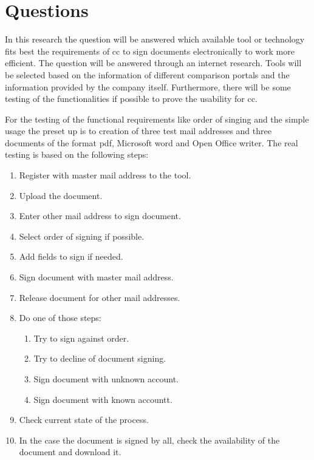 \section{Questions}

In this research the question will be answered which available tool or technology fits best the requirements of \gls{cc} to sign documents electronically to work more efficient. The  question will be answered through an internet research. Tools will be selected based on the information of different comparison portals and the information provided by the company itself. Furthermore, there will be some testing of the functionalities if possible to prove the usability for \gls{cc}. 

For the testing of the functional requirements like order of singing and the simple usage the preset up is to creation of three test mail addresses and three documents of the format \gls{pdf}, Microsoft word and Open Office writer. The real testing is based on the following steps:
\begin{enumerate}
	\item Register with master mail address to the tool.
	\item Upload the document.
	\item Enter other mail address to sign document.
	\item Select order of signing if possible.
	\item Add fields to sign if needed.
	\item Sign document with master mail address.
	\item Release document for other mail addresses.
	\item Do one of those steps:
	\begin{enumerate}
		\item Try to sign against order.
		\item Try to decline of document signing.
		\item Sign document with unknown account.
		\item Sign document with known accountt. 
	\end{enumerate}
	\item Check current state of the process.
	\item In the case the document is signed by all, check the availability of the document and download it.
\end{enumerate}